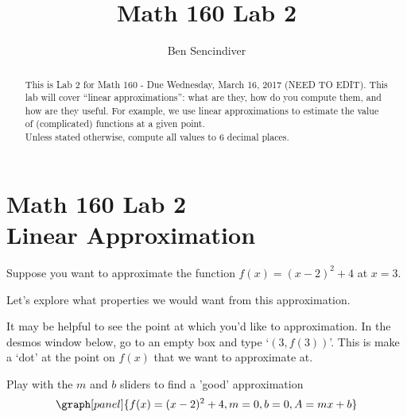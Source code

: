 \documentclass[handout,nooutcomes]{ximera}
\title{Math 160 Lab 2}
\author{Ben Sencindiver} %
\begin{document}
\section{Math 160 Lab 2 \\ Linear Approximation}

\begin{abstract}
This is Lab 2 for Math 160 - Due Wednesday, March 16, 2017 (NEED TO EDIT). This lab will cover ``linear approximations'': what are they, how do you compute them, and how are they useful. For example, we use linear approximations to estimate the value of (complicated) functions at a given point.\\

Unless stated otherwise, compute all values to $6$ decimal places.
\end{abstract}

\maketitle

\bigskip





Suppose you want to approximate the function $f(x) = (x-2)^2  + 4$ at $x=3$.

Let's explore what properties we would want from this approximation.

It may be helpful to see the point at which you'd like to approximation. 
In the desmos window below, go to an empty box and type `$(3,f(3))$'. 
This is make a `dot' at the point on $f(x)$ that we want to approximate at.

Play with the $m$ and $b$ sliders to find a 'good' approximation
\[
\graph[panel]{f(x) = (x-2)^2 + 4, m=0, b=0, A=mx+b}
\]
\end{document}

